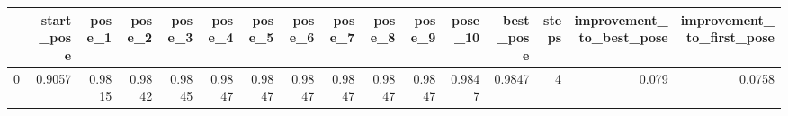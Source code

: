 \begin{tabular}{lrrrrrrrrrrrrrrr}
\toprule
{} &  start\_pose &  pose\_1 &  pose\_2 &  pose\_3 &  pose\_4 &  pose\_5 &  pose\_6 &  pose\_7 &  pose\_8 &  pose\_9 &  pose\_10 &  best\_pose &  steps &  improvement\_to\_best\_pose &  improvement\_to\_first\_pose \\
\midrule
0 &      0.9057 &  0.9815 &  0.9842 &  0.9845 &  0.9847 &  0.9847 &  0.9847 &  0.9847 &  0.9847 &  0.9847 &   0.9847 &     0.9847 &      4 &                     0.079 &                     0.0758 \\
\bottomrule
\end{tabular}
